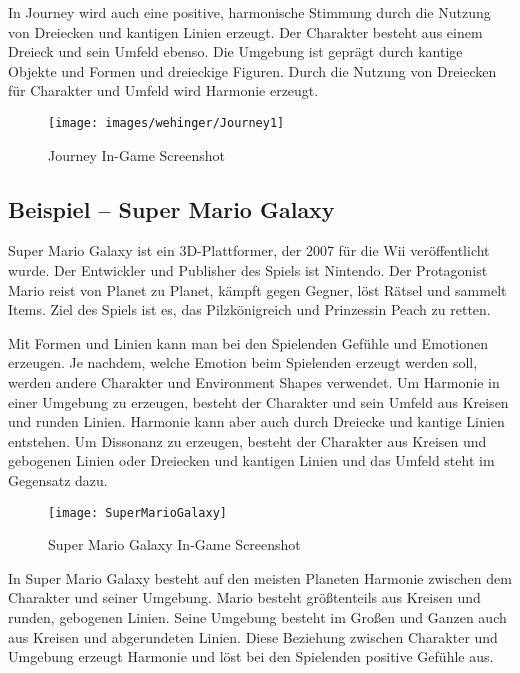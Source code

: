 In Journey wird auch eine positive, harmonische Stimmung durch die Nutzung von Dreiecken und kantigen Linien erzeugt. Der Charakter besteht aus einem Dreieck und sein Umfeld ebenso. Die Umgebung ist geprägt durch kantige Objekte und Formen und dreieckige Figuren. Durch die Nutzung von Dreiecken für Charakter und Umfeld wird Harmonie erzeugt. 
\cite{_drawing_basics_and_video_game_art}

\begin{figure}[H]
	\centering
	\texttt{[image: images/wehinger/Journey1]}
	\caption{Journey In-Game Screenshot \cite{_journey}}
\end{figure}

\subsection{Beispiel – Super Mario Galaxy}
Super Mario Galaxy ist ein 3D-Plattformer, der 2007 für die Wii veröffentlicht wurde. Der Entwickler und Publisher des Spiels ist Nintendo. Der Protagonist Mario reist von Planet zu Planet, kämpft gegen Gegner, löst Rätsel und sammelt Items. Ziel des Spiels ist es, das Pilzkönigreich und Prinzessin Peach zu retten. 
\cite{_super_mario_galaxy}

Mit Formen und Linien kann man bei den Spielenden Gefühle und Emotionen erzeugen. Je nachdem, welche Emotion beim Spielenden erzeugt werden soll, werden andere Charakter und Environment Shapes verwendet. Um Harmonie in einer Umgebung zu erzeugen, besteht der Charakter und sein Umfeld aus Kreisen und runden Linien. Harmonie kann aber auch durch Dreiecke und kantige Linien entstehen. Um Dissonanz zu erzeugen, besteht der Charakter aus Kreisen und gebogenen Linien oder Dreiecken und kantigen Linien und das Umfeld steht im Gegensatz dazu.
\cite{_drawing_basics_and_video_game_art}

\begin{figure}[H]
	\centering
	\texttt{[image: SuperMarioGalaxy]}
	\caption{Super Mario Galaxy In-Game Screenshot\cite{_drawing_basics_and_video_game_art}}
\end{figure}

In Super Mario Galaxy besteht auf den meisten Planeten Harmonie zwischen dem Charakter und seiner Umgebung. Mario besteht größtenteils aus Kreisen und runden, gebogenen Linien. Seine Umgebung besteht im Großen und Ganzen auch aus Kreisen und abgerundeten Linien. Diese Beziehung zwischen Charakter und Umgebung erzeugt Harmonie und löst bei den Spielenden positive Gefühle aus. 
\cite{_drawing_basics_and_video_game_art}



